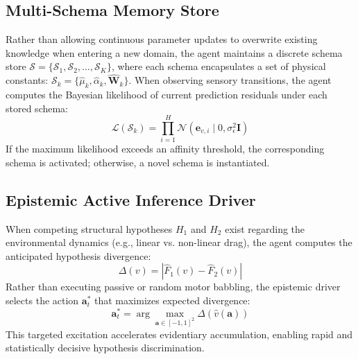 \documentclass[preprint,12pt]{elsarticle}
\begin{document}
\subsection{Multi-Schema Memory Store}
Rather than allowing continuous parameter updates to overwrite existing knowledge when entering a new domain, the agent maintains a discrete schema store $\mathcal{S} = \{\mathcal{S}_1, \mathcal{S}_2, \dots, \mathcal{S}_K\}$, where each schema encapsulates a set of physical constants: $\mathcal{S}_k = \{\hat{\mu}_k, \hat{\alpha}_k, \hat{\mathbf{W}}_k\}$. 
When observing sensory transitions, the agent computes the Bayesian likelihood of current prediction residuals under each stored schema:
\begin{equation}
\mathcal{L}(\mathcal{S}_k) = \prod_{i=1}^H \mathcal{N}(\mathbf{e}_{v, i} \mid 0, \sigma_\epsilon^2 \mathbf{I})
\end{equation}
If the maximum likelihood exceeds an affinity threshold, the corresponding schema is activated; otherwise, a novel schema is instantiated.

\subsection{Epistemic Active Inference Driver}
When competing structural hypotheses $H_1$ and $H_2$ exist regarding the environmental dynamics (e.g., linear vs. non-linear drag), the agent computes the anticipated hypothesis divergence:
\begin{equation}
\Delta(v) = |\hat{F}_1(v) - \hat{F}_2(v)|
\end{equation}
Rather than executing passive or random motor babbling, the epistemic driver selects the action $\mathbf{a}_t^*$ that maximizes expected divergence:
\begin{equation}
\mathbf{a}_t^* = \arg\max_{\mathbf{a} \in [-1, 1]^2} \Delta\left(\hat{v}(\mathbf{a})\right)
\end{equation}
This targeted excitation accelerates evidentiary accumulation, enabling rapid and statistically decisive hypothesis discrimination.
\end{document}
